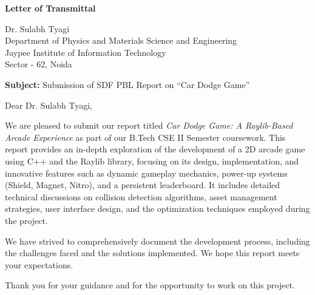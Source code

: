 \documentclass[12pt,a4paper]{article}
\begin{document}
\begin{center}
    \Large\textbf{Letter of Transmittal}
\end{center}
\vspace{1cm}

\noindent
Dr. Sulabh Tyagi \\
Department of Physics and Materials Science and Engineering \\
Jaypee Institute of Information Technology \\
Sector - 62, Noida \\

\vspace{1cm}

\noindent
\textbf{Subject:} Submission of SDF PBL Report on ``Car Dodge Game'' \\

\vspace{1cm}

\noindent
Dear Dr. Sulabh Tyagi, \\

\vspace{1em}

\noindent
We are pleased to submit our report titled \textit{Car Dodge Game: A Raylib-Based Arcade Experience} as part of our B.Tech CSE II Semester coursework. This report provides an in-depth exploration of the development of a 2D arcade game using C++ and the Raylib library, focusing on its design, implementation, and innovative features such as dynamic gameplay mechanics, power-up systems (Shield, Magnet, Nitro), and a persistent leaderboard. It includes detailed technical discussions on collision detection algorithms, asset management strategies, user interface design, and the optimization techniques employed during the project. \\

\vspace{1em}

\noindent
We have strived to comprehensively document the development process, including the challenges faced and the solutions implemented. We hope this report meets your expectations. \\

\vspace{1em}

\noindent
Thank you for your guidance and for the opportunity to work on this project. \\

\vspace{2em}
\end{document}
